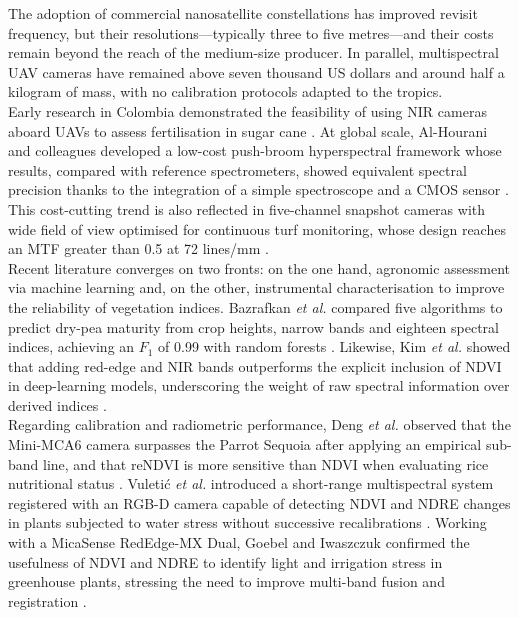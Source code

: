 \noindent The adoption of commercial nanosatellite constellations has improved
revisit frequency, but their resolutions—typically three to five
metres—and their costs remain beyond the reach of the medium-size
producer.  In parallel, multispectral UAV cameras have remained above
seven thousand US dollars and around half a kilogram of mass, with no
calibration protocols adapted to the tropics.\\

\noindent Early research in Colombia demonstrated the feasibility of using
NIR cameras aboard UAVs to assess fertilisation in sugar cane
\cite{Navia2016MultispectralUAV}.  At global scale, Al-Hourani and
colleagues developed a low-cost push-broom hyperspectral framework whose
results, compared with reference spectrometers, showed equivalent
spectral precision thanks to the integration of a simple spectroscope
and a CMOS sensor \cite{Al-Hourani2023LinePlatforms}.  This cost-cutting
trend is also reflected in five-channel snapshot cameras with wide field
of view optimised for continuous turf monitoring, whose design reaches
an MTF greater than 0.5 at 72 lines/mm
\cite{Smeesters2023Wide-Field-of-ViewMonitoring}.\\

\noindent Recent literature converges on two fronts: on the one hand,
agronomic assessment via machine learning and, on the other,
instrumental characterisation to improve the reliability of vegetation
indices.  Bazrafkan \emph{et al.} compared five algorithms to predict
dry-pea maturity from crop heights, narrow bands and eighteen spectral
indices, achieving an \(F_1\) of 0.99 with random forests
\cite{Bazrafkan2023PredictingUASs}.  Likewise, Kim \emph{et al.} showed
that adding red-edge and NIR bands outperforms the explicit inclusion of
NDVI in deep-learning models, underscoring the weight of raw spectral
information over derived indices \cite{Kim2023DeepClassification}.\\

\noindent Regarding calibration and radiometric performance,
Deng \emph{et al.} observed that the Mini-MCA6 camera surpasses the
Parrot Sequoia after applying an empirical sub-band line, and that
reNDVI is more sensitive than NDVI when evaluating rice nutritional
status \cite{Deng2018UAV-basedCameras}.  Vuletić \emph{et al.}
introduced a short-range multispectral system registered with an RGB-D
camera capable of detecting NDVI and NDRE changes in plants subjected to
water stress without successive recalibrations
\cite{Vuletic2023Close-rangeSystem}.  Working with a MicaSense RedEdge-MX
Dual, Goebel and Iwaszczuk confirmed the usefulness of NDVI and NDRE to
identify light and irrigation stress in greenhouse plants, stressing the
need to improve multi-band fusion and registration
\cite{Goebel2023SPECTRALCAMERA}.\\

